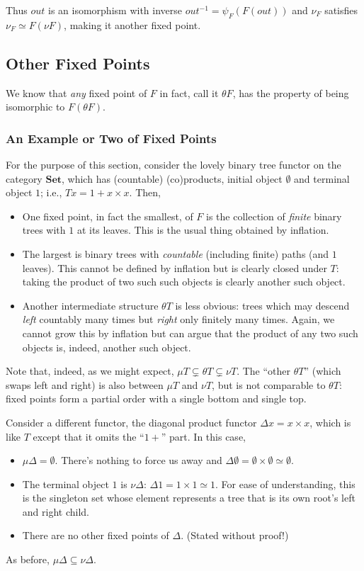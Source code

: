 \documentclass[letterpaper]{article}
\begin{document}
Thus $out$ is an isomorphism with inverse $out^{-1} = \psi_F(F(out))$ and
$\nu_F$ satisfies $\nu_F \simeq F(\nu F)$, making it another fixed point.

\subsection{Other Fixed Points}

We know that {\em any} fixed point of $F$ in fact, call it $\theta F$, has
the property of being isomorphic to $F(\theta F)$.

\subsubsection{An Example or Two of Fixed Points}

For the purpose of this section, consider the lovely binary tree functor on
the category $\mathbf{Set}$, which has (countable) (co)products, initial
object $\emptyset$ and terminal object $1$; i.e., $T x = 1 + x \times x$.
Then,
%
\begin{itemize}
%
  \item One fixed point, in fact the smallest, of $F$ is the collection of
  {\em finite} binary trees with $1$ at its leaves.  This is the usual thing
  obtained by inflation.
%
  \item The largest is binary trees with {\em countable} (including finite)
  paths (and $1$ leaves).  This cannot be defined by inflation but is
  clearly closed under $T$: taking the product of two such such objects is
  clearly another such object.
%
  \item Another intermediate structure $\theta T$ is less obvious: trees
  which may descend {\em left} countably many times but {\em right} only
  finitely many times.  Again, we cannot grow this by inflation but can
  argue that the product of any two such objects is, indeed, another such
  object.
%
\end{itemize}
%
Note that, indeed, as we might expect, $\mu T \subsetneq \theta T \subsetneq
\nu T$.  The ``other $\theta T$'' (which swaps left and right) is also
between $\mu T$ and $\nu T$, but is not comparable to $\theta T$: fixed
points form a partial order with a single bottom and single top.

Consider a different functor, the diagonal product functor $\Delta x = x
\times x$, which is like $T$ except that it omits the ``$1 +$'' part.  In
this case,
%
\begin{itemize}
%
  \item $\mu \Delta = \emptyset$.  There's nothing to force us away and
  $\Delta \emptyset = \emptyset \times \emptyset \simeq \emptyset$.
%
  \item The terminal object $1$ is $\nu \Delta$: $\Delta 1 = 1 \times 1
  \simeq 1$.  For ease of understanding, this is the singleton set whose
  element represents a tree that is its own root's left and right child.
%
  \item There are no other fixed points of $\Delta$.  (Stated without
  proof!)
%
\end{itemize}
%
As before, $\mu \Delta \subseteq \nu \Delta$.
\end{document}

